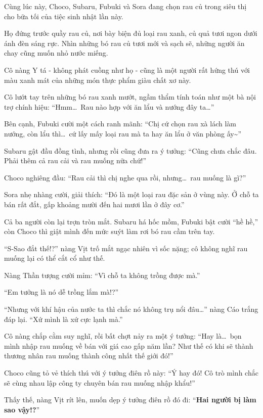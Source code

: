 \documentclass[../main.tex]{subfiles}
\begin{document}
Cùng lúc này, Choco, Subaru, Fubuki và Sora đang chọn rau củ trong siêu thị cho bữa tối của tiệc sinh nhật lần này.

Họ đứng trước quầy rau củ, nơi bày biện đủ loại rau xanh, củ quả tươi ngon dưới ánh đèn sáng rực. Nhìn những bó rau củ tươi mới và sạch sẽ, những người ăn chay cũng muốn nhỏ nước miếng.

Cô nàng Y tá - không phát cuồng như họ - cũng  là một người rất hứng thú với màu xanh mát của những món thực phẩm giàu chất xơ này.

Cô lướt tay trên những bó rau xanh mướt, ngầm thẩm tính toán như một bà nội trợ chính hiệu: ``Hmm\dots\ Rau nào hợp với ăn lẩu và nướng đây ta\dots''

Bên cạnh, Fubuki cười một cách ranh mãnh: ``Chị cứ chọn rau xà lách làm nướng, còn lẩu thì\dots\ cứ lấy mấy loại rau mà ta hay ăn lẩu ở văn phòng ấy\~{}''

Subaru gật đầu đồng tình, nhưng rồi cũng đưa ra ý tưởng: ``Cũng chưa chắc đâu. Phải thêm cả rau cải và rau muống nữa chứ!''

Choco nghiêng đầu: ``Rau cải thì chị nghe qua rồi, nhưng\dots\ rau muống là gì?''

Sora nhẹ nhàng cười, giải thích: ``Đó là một loại rau đặc sản ở vùng này. Ở chỗ ta bán rất đắt, gấp khoảng mười đến hai mươi lần ở đây cơ.''

Cả ba người còn lại trợn tròn mắt. Subaru há hốc mồm, Fubuki bật cười ``hề hề,'' còn Choco thì giật mình đến mức suýt làm rơi bó rau cầm trên tay.

``S-Sao đắt thế!?'' nàng Vịt trố mắt ngạc nhiên vì sốc nặng; cô không nghĩ rau muống lại có thể cắt cổ như thế.

Nàng Thần tượng cười mỉm: ``Vì chỗ ta không trồng được mà.''

``Em tưởng là nó dễ trồng lắm mà!?''

``Nhưng với khí hậu của nước ta thì chắc nó không trụ nổi đâu\dots'' nàng Cáo trắng đáp lại. ``Xứ mình là xứ cực lạnh mà.''

Cô nàng chắp cằm suy nghĩ, rồi bất chợt nảy ra một ý tưởng: ``Hay là\dots\ bọn mình nhập rau muống về bán với giá cao gấp năm lần? Như thế có khi sẽ thành thương nhân rau muống thành công nhất thế giới đó!''

Choco cũng tỏ vẻ thích thú với ý tưởng điên rồ này: ``Ý hay đó! Cô trò mình chắc sẽ cùng nhau lập công ty chuyên bán rau muống nhập khẩu!''

Thấy thế, nàng Vịt rít lên, muốn dẹp ý tưởng điên rồ đó đi: ``\textbf{Hai người bị làm sao vậy!?}''
\end{document}
